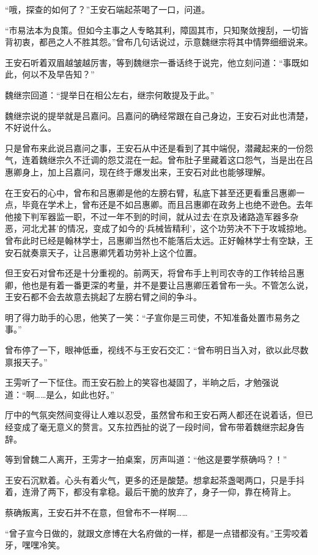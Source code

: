 “哦，探查的如何了？”王安石端起茶喝了一口，问道。

“市易法本为良策。但如今主事之人专略其利，障固其市，只知聚敛搜刮，一切皆背初衷，都邑之人不胜其怨。”曾布几句话说过，示意魏继宗将其中情弊细细说来。

王安石听着双眉越皱越厉害，等到魏继宗一番话终于说完，他立刻问道：“事既如此，何以不及早告知？”

魏继宗回道：“提举日在相公左右，继宗何敢提及于此。”

魏继宗说的提举就是吕嘉问。吕嘉问的确经常跟在自己身边，王安石对此也清楚，不好说什么。

只是曾布来此说吕嘉问之事，王安石从中还是看到了其中端倪，潜藏起来的一份怨气，连着魏继宗久不迁调的怨艾混在一起。曾布肚子里藏着这口怨气，当是出在吕惠卿身上，加上吕嘉问，现在终于爆发出来，王安石对此也能够理解。

在王安石的心中，曾布和吕惠卿是他的左膀右臂，私底下甚至还更看重吕惠卿一点，毕竟在学术上，曾布还是不如吕惠卿。而且吕惠卿在政务上也绝不逊色。去年他接下判军器监一职，不过一年不到的时间，就从过去‘在京及诸路造军器多杂恶，河北尤甚’的情况，变成了如今的‘兵械皆精利’，这个功劳决不下于攻城掠地。曾布此时已经是翰林学士，吕惠卿当然也不能落后太远。正好翰林学士有空缺，王安石就奏禀天子，让吕惠卿凭着功劳补上这个位置。

但王安石对曾布还是十分重视的。前两天，将曾布手上判司农寺的工作转给吕惠卿，他也是有着一番更深的考量，并不是要让吕惠卿压着曾布一头。不管怎么说，王安石都不会去故意去挑起了左膀右臂之间的争斗。

明了得力助手的心思，他笑了一笑：“子宣你是三司使，不知准备处置市易务之事。”

曾布停了一下，眼神低垂，视线不与王安石交汇：“曾布明日当入对，欲以此尽数禀报天子。”

王雱听了一下怔住。而王安石脸上的笑容也凝固了，半晌之后，才勉强说道：“啊……是么，如此也好。”

厅中的气氛突然间变得让人难以忍受，虽然曾布和王安石两人都还在说着话，但已经变成了毫无意义的赘言。又东拉西扯的说了一段时间，曾布带着魏继宗起身告辞。

等到曾魏二人离开，王雱才一拍桌案，厉声叫道：“他这是要学蔡确吗？！”

王安石沉默着。心头有着火气，更多的还是酸楚。想拿起茶盏喝两口，只是手抖着，连滑了两下，都没有拿稳。最后干脆的放弃了，身子一仰，靠在椅背上。

蔡确叛离，王安石并不在意，但曾布不一样啊……

“曾子宣今日做的，就跟文彦博在大名府做的一样，都是一点错都没有。”王雱咬着牙，嘿嘿冷笑。

